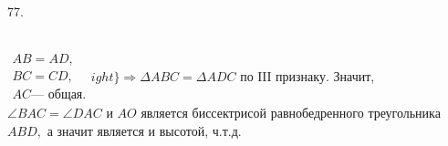 77. \begin{figure}[ht!]
\end{figure}\\
$\left.\begin{array}{l}AB=AD,\\
BC=CD,\\
AC\text{--- общая.}  \end{array}
ight\}\Rightarrow \Delta ABC=\Delta ADC\text{ по III признаку.}$ Значит, $\angle BAC=\angle DAC$ и $AO$ является биссектрисой равнобедренного треугольника $ABD,$ а значит является и высотой, ч.т.д.\\
